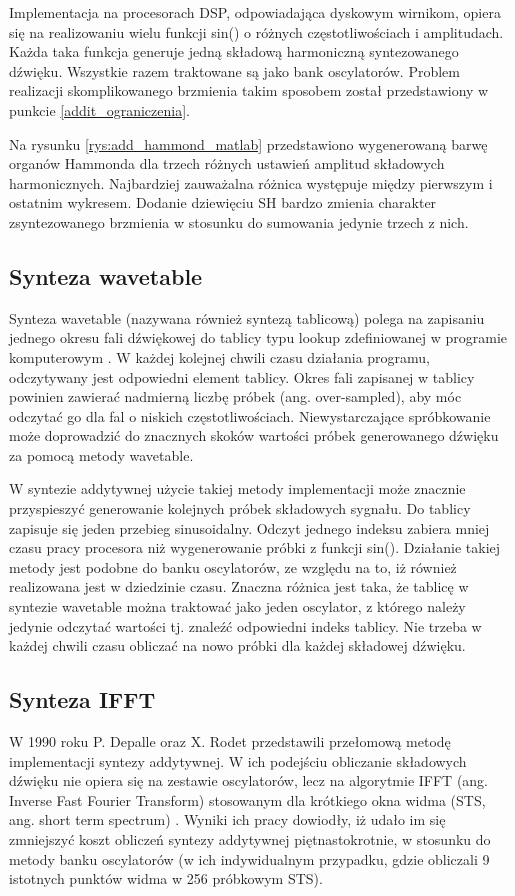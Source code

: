 Implementacja na procesorach DSP, odpowiadająca dyskowym wirnikom, opiera się na realizowaniu wielu funkcji sin() o różnych częstotliwościach i amplitudach. Każda taka funkcja generuje jedną składową harmoniczną syntezowanego dźwięku. Wszystkie razem traktowane są jako bank oscylatorów. Problem realizacji skomplikowanego brzmienia takim sposobem został przedstawiony w punkcie \ref{addit_ograniczenia}.

Na rysunku \ref{rys:add_hammond_matlab} przedstawiono wygenerowaną barwę organów Hammonda dla trzech różnych ustawień amplitud składowych harmonicznych. Najbardziej zauważalna różnica występuje między pierwszym i ostatnim wykresem. Dodanie dziewięciu SH bardzo zmienia charakter zsyntezowanego brzmienia w stosunku do sumowania jedynie trzech z nich.


\subsection{Synteza wavetable} \label{add_wavetable}
Synteza wavetable (nazywana również syntezą tablicową) polega na zapisaniu jednego okresu fali dźwiękowej do tablicy typu lookup zdefiniowanej w programie komputerowym \cite{add_wavetab_synt}. W każdej kolejnej chwili czasu działania programu, odczytywany jest odpowiedni element tablicy. Okres fali zapisanej w tablicy powinien zawierać nadmierną liczbę próbek (ang. over-sampled), aby móc odczytać go dla fal o niskich częstotliwościach. Niewystarczające spróbkowanie może doprowadzić do znacznych skoków wartości próbek generowanego dźwięku za pomocą metody wavetable.

W syntezie addytywnej użycie takiej metody implementacji może znacznie przyspieszyć generowanie kolejnych próbek składowych sygnału. Do tablicy zapisuje się jeden przebieg sinusoidalny. Odczyt jednego indeksu zabiera mniej czasu pracy procesora niż wygenerowanie próbki z funkcji sin(). Działanie takiej metody jest podobne do banku oscylatorów, ze względu na to, iż również realizowana jest w dziedzinie czasu. Znaczna różnica jest taka, że tablicę w syntezie wavetable można traktować jako jeden oscylator, z którego należy jedynie odczytać wartości tj. znaleźć odpowiedni indeks tablicy. Nie trzeba w każdej chwili czasu obliczać na nowo próbki dla każdej składowej dźwięku.

\subsection{Synteza IFFT}
W 1990 roku P. Depalle oraz X. Rodet \cite{add_ifft_orig} przedstawili przełomową metodę implementacji syntezy addytywnej. W ich podejściu obliczanie składowych dźwięku nie opiera się na zestawie oscylatorów, lecz na algorytmie IFFT (ang. Inverse Fast Fourier Transform) stosowanym dla krótkiego okna widma (STS, ang. short term spectrum) \cite{add_ifft_method}. Wyniki ich pracy dowiodły, iż udało im się zmniejszyć koszt obliczeń syntezy addytywnej piętnastokrotnie, w stosunku do metody banku oscylatorów (w ich indywidualnym przypadku, gdzie obliczali 9 istotnych punktów widma w 256 próbkowym STS).

